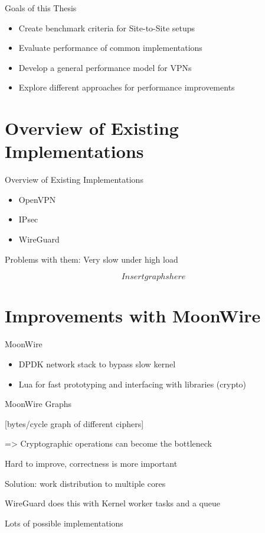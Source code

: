 \documentclass[NET,english]{tumbeamer}
\begin{document}
\begin{frame}{Goals of this Thesis}
	\begin{itemize}
		\item Create benchmark criteria for Site-to-Site setups
		\item Evaluate performance of common implementations
		\item Develop a general performance model for VPNs
		\item Explore different approaches for performance improvements
	\end{itemize}
\end{frame}

\section{Overview of Existing Implementations}
\begin{frame}{Overview of Existing Implementations}
	\begin{itemize}
		\item OpenVPN
		\item IPsec
		\item WireGuard
	\end{itemize}

	Problems with them: Very slow under high load
\end{frame}

\begin{frame}
	\[ Insert graphs here \]
\end{frame}

\section{Improvements with MoonWire}
\begin{frame}{MoonWire}
	\begin{itemize}
		\item DPDK network stack to bypass slow kernel
		\item Lua for fast prototyping and interfacing with libraries (crypto)
	\end{itemize}
\end{frame}

\begin{frame}{MoonWire Graphs}
	 
	 [bytes/cycle graph of different ciphers]
	
	=> Cryptographic operations can become the bottleneck

	Hard to improve, correctness is more important
	
	Solution: work distribution to multiple cores
	
	WireGuard does this with Kernel worker tasks and a queue
	
	Lots of possible implementations
\end{frame}
\end{document}
